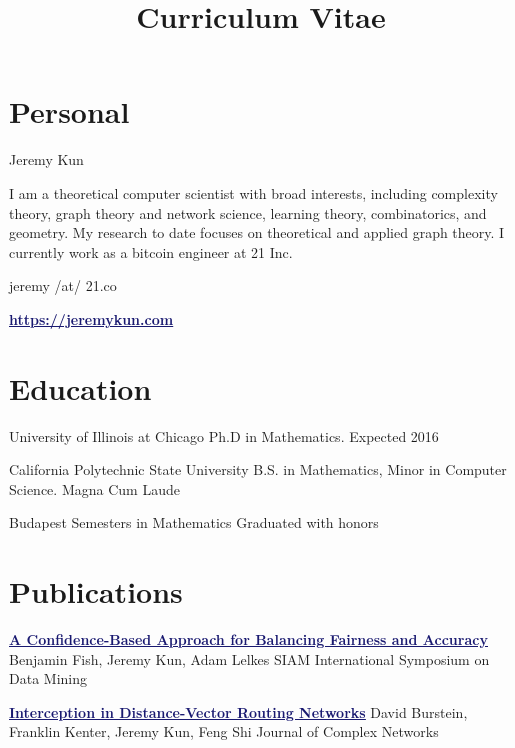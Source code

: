 \documentclass[11pt]{moderncv}
\title{Curriculum Vitae}
\begin{document}
   \maketitle

      \section{Personal}
         {Jeremy Kun}

         {I am a theoretical computer scientist with broad interests, including complexity theory, graph theory and network science, learning theory, combinatorics, and geometry. My research to date focuses on theoretical and applied graph theory. I currently work as a bitcoin engineer at 21 Inc.}

         {jeremy /at/ 21.co}

         {\href{https://jeremykun.com}{\textcolor{MidnightBlue}{\underline{\textbf{https://jeremykun.com}}}}}


   \section{Education}
         {University of Illinois at Chicago}
      {}
      {Ph.D in Mathematics.}
      {Expected 2016}
      {}

         {California Polytechnic State University}
      {}
      {B.S. in Mathematics, Minor in Computer Science.}
      {Magna Cum Laude}
      {}

         {Budapest Semesters in Mathematics}
      {}
{}
      {Graduated with honors}
      {}


   \section{Publications}
         {\href{}{\textcolor{MidnightBlue}{\underline{\textbf{A Confidence-Based Approach for Balancing Fairness and Accuracy}}}}}
      {Benjamin Fish, Jeremy Kun, Adam Lelkes}
      {SIAM International Symposium on Data Mining}
      {}
      {}

         {\href{http://arxiv.org/abs/1507.05206}{\textcolor{MidnightBlue}{\underline{\textbf{Interception in Distance-Vector Routing Networks}}}}}
      {David Burstein, Franklin Kenter, Jeremy Kun, Feng Shi}
      {Journal of Complex Networks}
      {}
      {}
\end{document}

